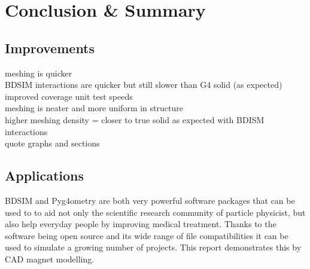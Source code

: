 \documentclass[12pt,a4paper]{article}
\begin{document}
\newpage
\section{Conclusion \& Summary}
\label{conc}

\subsection{Improvements}
meshing is quicker\\
BDSIM interactions are quicker but still slower than G4 solid (as expected)
improved coverage unit test speeds\\
meshing is neater and more uniform in structure\\
higher meshing density = closer to true solid as expected with BDISM interactions\\
quote graphs and sections\\

\subsection{Applications}
BDSIM and Pyg4ometry are both very powerful software packages that can be used to to aid not only the scientific research community of particle physicist, but also help everyday people by improving medical treatment. Thanks to the software being open source and its wide range of file compatibilities it can be used to simulate a growing number of projects. This report demonstrates this by CAD magnet modelling.
\end{document}
